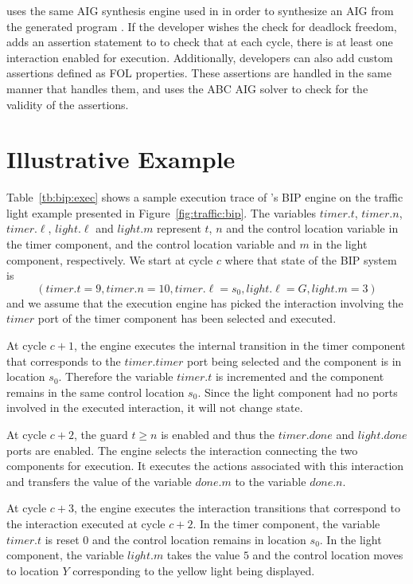 \biptool{} uses the same AIG synthesis engine used in \mytool{} in order to 
synthesize an AIG from the generated \thislanguage{} program \aigcircuit. 
If the developer wishes the check for deadlock freedom, \biptool{} adds 
an assertion statement to \aigcircuit{} to check that at each cycle, 
there is at least one interaction enabled for execution. Additionally, 
developers can also add custom assertions defined as FOL properties. These assertions
are handled in the same manner that \mytool{} handles them, and \biptool{}
uses the ABC AIG solver to check for the validity of the assertions. 

\section{Illustrative Example}
Table~\ref{tb:bip:exec} shows a sample execution trace of \mytool's BIP engine
on the traffic light example presented in Figure~\ref{fig:traffic:bip}. The variables 
$timer.t$, $timer.n$, $timer.\ell$, $light.\ell$ and $light.m$ represent $t$, $n$
and the control location variable in the timer component, and the control location variable
and $m$ in the light component, respectively. 
We start at cycle $c$ where that state of the BIP system is $$\left(timer.t = 9, timer.n = 10,
timer.\ell = s_0, light.\ell = G, light.m = 3\right)$$
and we assume that the execution engine has picked the interaction involving the 
$timer$ port of the timer component has been selected and executed. 

At cycle $c+1$, the engine executes the internal transition in the timer component
that corresponds to the $timer.timer$ port being selected and the component is in location $s_0$. 
Therefore the variable $timer.t$ is incremented and the component 
remains in the same control location $s_0$. Since the light component
had no ports involved in the executed interaction, it will not change 
state. 

At cycle $c+2$, the guard $t \geq n$ is enabled and thus the $timer.done$ and $light.done$ ports are enabled. 
The engine selects the interaction connecting the two components
for execution. It executes the actions associated with this interaction 
and transfers the value of the variable $done.m$ to the variable $done.n$.

At cycle $c+3$, the engine executes the interaction transitions that 
correspond to the interaction executed at cycle $c+2$. In the timer 
component, the variable $timer.t$ is reset $0$ and the control location 
remains in location $s_0$. In the light component, the variable 
$light.m$ takes the value $5$ and the control location moves to location 
$Y$ corresponding to the yellow light being displayed. 

